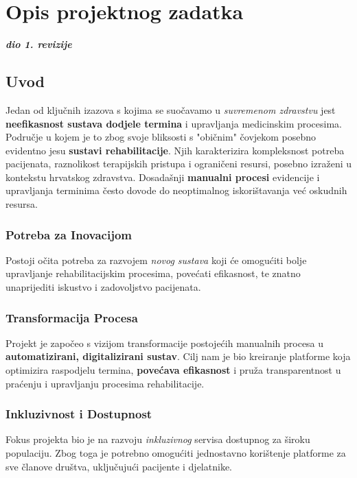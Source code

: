 \chapter{Opis projektnog zadatka}
		
		\textbf{\textit{dio 1. revizije}}\\

        \section*{Uvod}

        Jedan od ključnih izazova s kojima se suočavamo u \textit{suvremenom zdravstvu} jest \textbf{neefikasnost sustava dodjele termina} i upravljanja medicinskim procesima. Područje u kojem je to zbog svoje bliksosti s "običnim" čovjekom posebno evidentno jesu \textbf{sustavi rehabilitacije}. Njih karakterizira kompleksnost potreba pacijenata, raznolikost terapijskih pristupa i ograničeni resursi, posebno izraženi u kontekstu hrvatskog zdravstva. Dosadašnji \textbf{manualni procesi} evidencije i upravljanja terminima često dovode do neoptimalnog iskorištavanja već oskudnih resursa.
        
        \subsection*{\textbf{\large Potreba za Inovacijom}}
        Postoji očita potreba za razvojem \textit{novog sustava} koji će omogućiti bolje upravljanje rehabilitacijskim procesima, povećati efikasnost, te znatno unaprijediti iskustvo i zadovoljstvo pacijenata.
        
        \subsection*{\textbf{\large Transformacija Procesa}}
        Projekt je započeo s vizijom transformacije postojećih manualnih procesa u \textbf{automatizirani, digitalizirani sustav}. Cilj nam je bio kreiranje platforme koja optimizira raspodjelu termina, \textbf{povećava efikasnost} i pruža transparentnost u praćenju i upravljanju procesima rehabilitacije.
        
        \subsection*{\textbf{\large Inkluzivnost i Dostupnost}}
        Fokus projekta bio je na razvoju \textit{inkluzivnog} servisa dostupnog za široku populaciju. Zbog toga je potrebno omogućiti jednostavno korištenje platforme za sve članove društva, uključujući pacijente i djelatnike.
        
